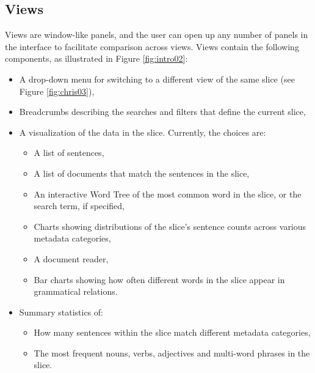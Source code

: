 \documentclass{sig-alternate}
\begin{document}
\subsection{Views}
Views  are window-like panels, and the user can open up any number of panels in the interface to facilitate comparison across views.  Views contain the following components, as illustrated in Figure \ref{fig:intro02}:
\begin{itemize}
	\item A drop-down menu for switching to a different view of the same slice (see Figure \ref{fig:chris03}),
	\item Breadcrumbs describing the searches and filters that define the current slice,
	\item A visualization of the data in the slice. Currently, the choices are:
		\begin{itemize}
			\item A list of sentences,
			\item A list of documents that match the sentences in the slice,
			\item An interactive Word Tree \cite{wattenberg_word_2008} of the most common word in the slice, or the search term, if specified,
			\item Charts showing distributions of the slice's sentence counts across various metadata categories,
			\item A document reader,
			\item Bar charts showing how often different words in the slice  appear in grammatical relations.
		\end{itemize}
	\item Summary statistics of:
		\begin{itemize}
			\item How many sentences within the slice match different metadata categories,
			\item The most frequent nouns, verbs, adjectives and multi-word phrases in the slice.
		\end{itemize}
\end{itemize}
\end{document}
